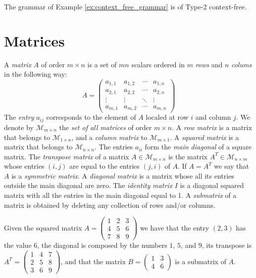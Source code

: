 \begin{example}
The grammar of Example \ref{ex:context_free_grammar} is of Type-2 context-free.
\end{example}

%
%

\section{Matrices}
\label{sec:preliminaries-matrices}

A \emph{matrix} $A$ of order $m \times n$ is a set of $mn$ scalars ordered in $m$ \emph{rows} and $n$ \emph{colums} in the following way:
\[
A = 
 \begin{pmatrix}
  a_{1,1} & a_{1,2} & \cdots & a_{1,n} \\
  a_{2,1} & a_{2,2} & \cdots & a_{2,n} \\
  \vdots  & \vdots  & \ddots & \vdots  \\
  a_{m,1} & a_{m,2} & \cdots & a_{m,n} 
 \end{pmatrix}
\]
The \emph{entry} $a_{ij}$ corresponds to the element of $A$ localed at row $i$ and column $j$. We denote by $\mathcal{M}_{m \times n}$ the \emph{set of all matrices} of order $m \times n$. A \emph{row matrix} is a matrix that belongs to $\mathcal{M}_{1 \times n}$, and a \emph{column matrix} to $\mathcal{M}_{m \times 1}$. A \emph{squared matrix} is a matrix that belongs to $\mathcal{M}_{n \times n}$. The entries $a_{ii}$ form the \emph{main diagonal} of a square matrix. The \emph{transpose matrix} of a matrix $A \in \mathcal{M}_{m \times n}$ is the matrix $A^T \in \mathcal{M}_{n \times m}$ whose entries $(i,j)$ are equal to the entries $(j, i)$ of $A$. If $A = A^T$ we say that $A$ is a \emph{symmetric matrix}. A \emph{diagonal matrix} is a matrix whose all its entries outside the main diagonal are zero. The \emph{identity matrix} $I$ is a diagonal squared matrix with all the entries in the main diagonal equal to 1. A \emph{submatrix} of a matrix is obtained by deleting any collection of rows and/or columns.

\begin{example}
Given the squared matrix $A = \left( \begin{smallmatrix} 1 & 2 & 3 \\ 4 & 5 & 6 \\ 7 & 8 & 9 \end{smallmatrix} \right)$ we have that the entry $(2, 3)$ has the value $6$, the diagonal is composed by the numbers $1$, $5$, and $9$, its transpose is $A^T = \left( \begin{smallmatrix} 1 & 4 & 7 \\ 2 & 5 & 8 \\ 3 & 6 & 9 \end{smallmatrix} \right)$, and that the matrix $B = \left( \begin{smallmatrix} 1 & 3 \\ 4 & 6 \end{smallmatrix} \right)$ is a submatrix of $A$.
\end{example}

